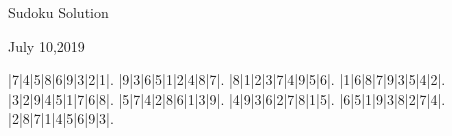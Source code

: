 \documentclass{article}
\begin{document}
\begin{center}
\Huge{Sudoku Solution}
\end{center}
\begin{center}
\Large{July 10,2019}
\end{center}
\begin{sudoku}
|7|4|5|8|6|9|3|2|1|.
|9|3|6|5|1|2|4|8|7|.
|8|1|2|3|7|4|9|5|6|.
|1|6|8|7|9|3|5|4|2|.
|3|2|9|4|5|1|7|6|8|.
|5|7|4|2|8|6|1|3|9|.
|4|9|3|6|2|7|8|1|5|.
|6|5|1|9|3|8|2|7|4|.
|2|8|7|1|4|5|6|9|3|.
\end{sudoku}
\end{document}
